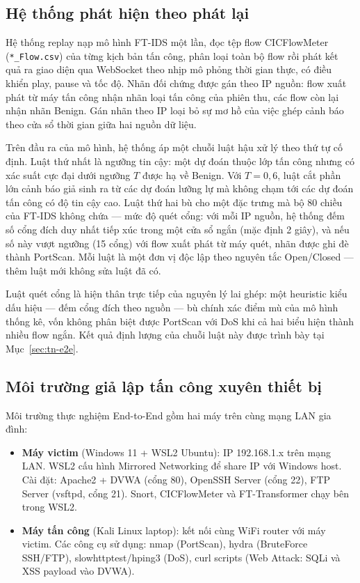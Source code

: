 \documentclass[../DoAn.tex]{subfiles}
\begin{document}
\subsection{Hệ thống phát hiện theo phát lại}
\label{subsec:deploy-replay}

Hệ thống replay nạp mô hình FT-IDS một lần, đọc tệp flow CICFlowMeter (\texttt{*\_Flow.csv}) của từng kịch bản tấn công, phân loại toàn bộ flow rồi phát kết quả ra giao diện qua WebSocket theo nhịp mô phỏng thời gian thực, có điều khiển play, pause và tốc độ. Nhãn đối chứng được gán theo IP nguồn: flow xuất phát từ máy tấn công nhận nhãn loại tấn công của phiên thu, các flow còn lại nhận nhãn Benign. Gán nhãn theo IP loại bỏ sự mơ hồ của việc ghép cảnh báo theo cửa sổ thời gian giữa hai nguồn dữ liệu.

Trên đầu ra của mô hình, hệ thống áp một chuỗi luật hậu xử lý theo thứ tự cố định. Luật thứ nhất là ngưỡng tin cậy: một dự đoán thuộc lớp tấn công nhưng có xác suất cực đại dưới ngưỡng $T$ được hạ về Benign. Với $T = 0{,}6$, luật cắt phần lớn cảnh báo giả sinh ra từ các dự đoán lưỡng lự mà không chạm tới các dự đoán tấn công có độ tin cậy cao. Luật thứ hai bù cho một đặc trưng mà bộ 80 chiều của FT-IDS không chứa --- mức độ quét cổng: với mỗi IP nguồn, hệ thống đếm số cổng đích duy nhất tiếp xúc trong một cửa sổ ngắn (mặc định 2 giây), và nếu số này vượt ngưỡng (15 cổng) với flow xuất phát từ máy quét, nhãn được ghi đè thành PortScan. Mỗi luật là một đơn vị độc lập theo nguyên tắc Open/Closed --- thêm luật mới không sửa luật đã có.

Luật quét cổng là hiện thân trực tiếp của nguyên lý lai ghép: một heuristic kiểu dấu hiệu --- đếm cổng đích theo nguồn --- bù chính xác điểm mù của mô hình thống kê, vốn không phân biệt được PortScan với DoS khi cả hai biểu hiện thành nhiều flow ngắn. Kết quả định lượng của chuỗi luật này được trình bày tại Mục~\ref{sec:tn-e2e}.

\subsection{Môi trường giả lập tấn công xuyên thiết bị}
\label{subsec:deploy-attack-sim}

Môi trường thực nghiệm End-to-End gồm hai máy trên cùng mạng LAN gia đình:

\begin{itemize}
    \item \textbf{Máy victim} (Windows 11 + WSL2 Ubuntu): IP 192.168.1.x trên mạng LAN. WSL2 cấu hình Mirrored Networking để share IP với Windows host. Cài đặt: Apache2 + DVWA (cổng 80), OpenSSH Server (cổng 22), FTP Server (vsftpd, cổng 21). Snort, CICFlowMeter và FT-Transformer chạy bên trong WSL2.

    \item \textbf{Máy tấn công} (Kali Linux laptop): kết nối cùng WiFi router với máy victim. Các công cụ sử dụng: nmap (PortScan), hydra (BruteForce SSH/FTP), slowhttptest/hping3 (DoS), curl scripts (Web Attack: SQLi và XSS payload vào DVWA).
\end{itemize}
\end{document}
